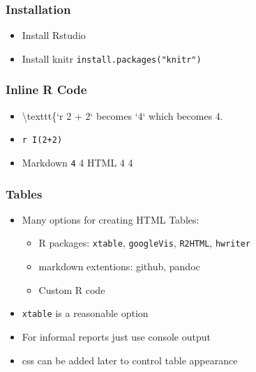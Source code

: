 \begin{frame}[fragile]\frametitle{Installation}

\begin{itemize}
\item
  Install Rstudio
\item
  Install knitr \texttt{install.packages("knitr")}
\end{itemize}

\end{frame}

\begin{frame}[fragile]\frametitle{Inline R Code}

\begin{itemize}
\item
  \textbackslash{}texttt\{`r 2 + 2` becomes `4` which becomes 4.
\item
  \texttt{r I(2+2)}
\item
  Markdown \texttt{4} 4 HTML 4 4
\end{itemize}

\end{frame}

\begin{frame}[fragile]\frametitle{Tables}

\begin{itemize}
\item
  Many options for creating HTML Tables:

  \begin{itemize}
  \item
    R packages: \texttt{xtable}, \texttt{googleVis}, \texttt{R2HTML},
    \texttt{hwriter}
  \item
    markdown extentions: github, pandoc
  \item
    Custom R code
  \end{itemize}
\item
  \texttt{xtable} is a reasonable option
\item
  For informal reports just use console output
\item
  css can be added later to control table appearance
\end{itemize}

\end{frame}

